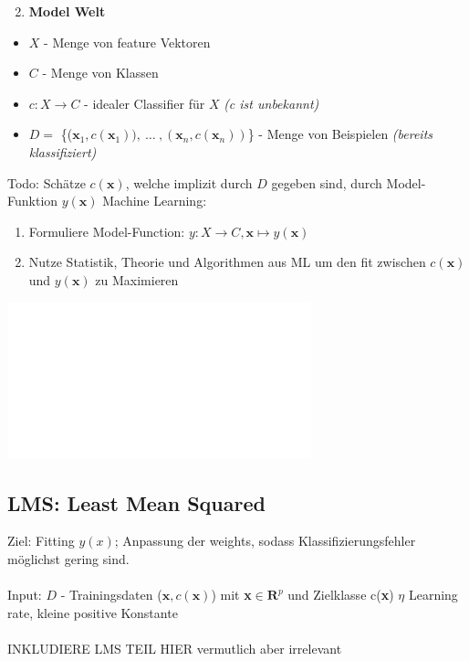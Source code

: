 \documentclass[11pt,a4paper]{article}
\begin{document}
\begin{flushleft}
    \begin{enumerate}
        \setcounter{enumi}{1}
        \item \textbf{Model Welt}
    \end{enumerate}
     \begin{itemize}
         \item $X$ - Menge von feature Vektoren
         \item $C$ - Menge von Klassen
         \item $c: X \rightarrow C$ - idealer Classifier für $X$ \textit{(c ist unbekannt)}
         \item $ D =$ \{($\textbf{x}_1,c(\textbf{x}_1)),\ \dots\ ,(\textbf{x}_n, c( \textbf{x}_n)) $\} - Menge von Beispielen \textit{(bereits klassifiziert)}
     \end{itemize}
    Todo: Schätze $c(\mathbf{x})$, welche implizit durch $D$ gegeben sind, durch
    \newline \quad Model-Funktion $y(\mathbf{x})$ 
    \newline\newline
    Machine Learning: \newline
    \begin{enumerate}
        \item Formuliere Model-Function: $y: X \rightarrow C, \mathbf{x} \mapsto y(\mathbf{x})$
        \item Nutze Statistik, Theorie und Algorithmen aus ML um den fit zwischen $c(\mathbf{x})$ und $y(\mathbf{x})$ zu Maximieren
    \end{enumerate}
    \includegraphics[width=\textwidth]{empty}
    
    \subsection{LMS: Least Mean Squared}
    Ziel: Fitting $y(x)$; Anpassung der weights, sodass Klassifizierungsfehler möglichst gering sind. \\~\\
    Input: $D$ - Trainingsdaten ($\mathbf{x},c(\mathbf{x})$) mit \textbf{x}$\in \textbf{R}^p$ und Zielklasse c(\textbf{x}) 
    $\eta$ Learning rate, kleine positive Konstante
    \\~\\
INKLUDIERE LMS TEIL HIER
vermutlich aber irrelevant


\end{flushleft}
\end{document}
